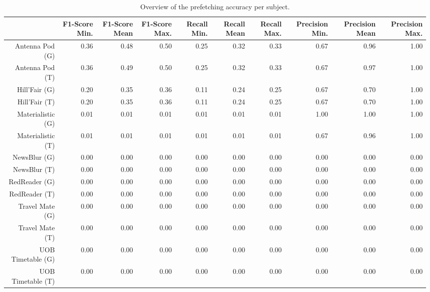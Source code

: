 \begin{table}[ht]
\centering
\begin{tabular}{rrrrrrrrrr}
  \hline
 & F1-Score Min. & F1-Score Mean & F1-Score Max. & Recall Min. & Recall Mean & Recall Max. & Precision Min. & Precision Mean & Precision Max. \\ 
  \hline
Antenna Pod (G) & 0.36 & 0.48 & 0.50 & 0.25 & 0.32 & 0.33 & 0.67 & 0.96 & 1.00 \\ 
  Antenna Pod (T) & 0.36 & 0.49 & 0.50 & 0.25 & 0.32 & 0.33 & 0.67 & 0.97 & 1.00 \\ 
  Hill'Fair (G) & 0.20 & 0.35 & 0.36 & 0.11 & 0.24 & 0.25 & 0.67 & 0.70 & 1.00 \\ 
  Hill'Fair (T) & 0.20 & 0.35 & 0.36 & 0.11 & 0.24 & 0.25 & 0.67 & 0.70 & 1.00 \\ 
  Materialistic (G) & 0.01 & 0.01 & 0.01 & 0.01 & 0.01 & 0.01 & 1.00 & 1.00 & 1.00 \\ 
  Materialistic (T) & 0.01 & 0.01 & 0.01 & 0.01 & 0.01 & 0.01 & 0.67 & 0.96 & 1.00 \\ 
  NewsBlur (G) & 0.00 & 0.00 & 0.00 & 0.00 & 0.00 & 0.00 & 0.00 & 0.00 & 0.00 \\ 
  NewsBlur (T) & 0.00 & 0.00 & 0.00 & 0.00 & 0.00 & 0.00 & 0.00 & 0.00 & 0.00 \\ 
  RedReader (G) & 0.00 & 0.00 & 0.00 & 0.00 & 0.00 & 0.00 & 0.00 & 0.00 & 0.00 \\ 
  RedReader (T) & 0.00 & 0.00 & 0.00 & 0.00 & 0.00 & 0.00 & 0.00 & 0.00 & 0.00 \\ 
  Travel Mate (G) & 0.00 & 0.00 & 0.00 & 0.00 & 0.00 & 0.00 & 0.00 & 0.00 & 0.00 \\ 
  Travel Mate (T) & 0.00 & 0.00 & 0.00 & 0.00 & 0.00 & 0.00 & 0.00 & 0.00 & 0.00 \\ 
  UOB Timetable (G) & 0.00 & 0.00 & 0.00 & 0.00 & 0.00 & 0.00 & 0.00 & 0.00 & 0.00 \\ 
  UOB Timetable (T) & 0.00 & 0.00 & 0.00 & 0.00 & 0.00 & 0.00 & 0.00 & 0.00 & 0.00 \\ 
   \hline
\end{tabular}
\caption{Overview of the prefetching accuracy per subject.} 
\label{tab:results:rq3:summary:subject:score}
\end{table}
